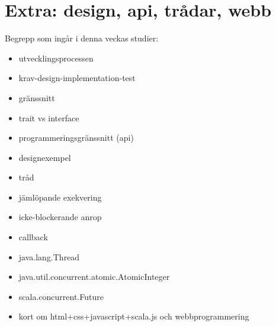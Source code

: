 \chapter{Extra: design, api, trådar, webb}\label{chapter:W13}
Begrepp som ingår i denna veckas studier:
\begin{itemize}[noitemsep,label={$\square$},leftmargin=*]
\item utvecklingsprocessen
\item krav-design-implementation-test
\item gränssnitt
\item trait vs interface
\item programmeringsgränssnitt (api)
\item designexempel
\item tråd
\item jämlöpande exekvering
\item icke-blockerande anrop
\item callback
\item java.lang.Thread
\item java.util.concurrent.atomic.AtomicInteger
\item scala.concurrent.Future
\item kort om html+css+javascript+scala.js och webbprogrammering\end{itemize}
